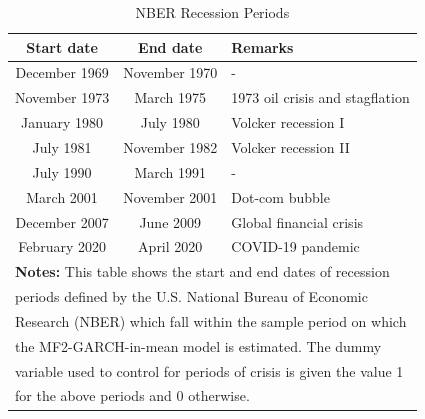 \documentclass[12pt]{article}
\begin{document}
\begin{table}[!ht]
\centering
\caption{NBER Recession Periods}
\begin{tabular}{ccl}
\midrule
\midrule
Start date & End date & Remarks\\
\midrule
December 1969 & November 1970 & - \\
November 1973 & March 1975 & 1973 oil crisis and stagflation \\
January 1980 & July 1980 & Volcker recession I \\
July 1981 & November 1982 & Volcker recession II \\
July 1990 & March 1991 & - \\
March 2001 & November 2001 & Dot-com bubble \\
December 2007 & June 2009 & Global financial crisis \\
February 2020 & April 2020 & COVID-19 pandemic \\
\midrule
\multicolumn{3}{l}{\textbf{Notes:} This table shows the start and end dates of recession}\\
\multicolumn{3}{l}{periods defined by the U.S. National Bureau of Economic}\\
\multicolumn{3}{l}{Research (NBER) which fall within the sample period on which}\\
\multicolumn{3}{l}{the MF2-GARCH-in-mean model is estimated. The dummy}\\
\multicolumn{3}{l}{variable used to control for periods of crisis is given the value 1}\\
\multicolumn{3}{l}{for the above periods and 0 otherwise.}\\
\midrule
\midrule
\end{tabular}
\end{table}

\pagebreak
\restoregeometry
{}
\end{document}
